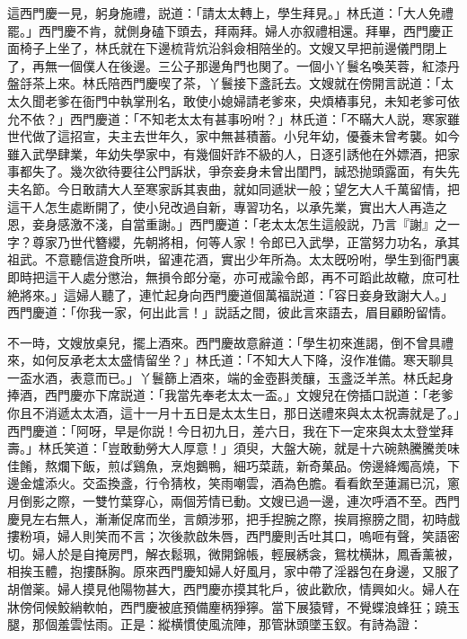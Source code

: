 這西門慶一見，躬身施禮，説道：「請太太轉上，學生拜見。」林氏道：「大人免禮罷。」西門慶不肯，就側身磕下頭去，拜兩拜。婦人亦叙禮相還。拜畢，西門慶正面椅子上坐了，林氏就在下邊梳背炕沿斜僉相陪坐的。文嫂又早把前邊儀門閉上了，再無一個僕人在後邊。三公子那邊角門也関了。一個小丫鬟名喚芙蓉，紅漆丹盤㧱茶上來。林氏陪西門慶喫了茶，丫鬟接下盞託去。文嫂就在傍開言説道：「太太久聞老爹在衙門中執掌刑名，敢使小媳婦請老爹來，央煩樁事兒，未知老爹可依允不依？」西門慶道：「不知老太太有甚事吩咐？」林氏道：「不瞞大人説，寒家雖世代做了這招宣，夫主去世年久，家中無甚積蓄。小兒年幼，優養未曾考襲。如今雖入武學肆業，年幼失學家中，有幾個奸詐不級的人，日逐引誘他在外嫖酒，把家事都失了。幾次欲待要往公門訴狀，爭奈妾身未曾出閨門，誠恐抛頭露面，有失先夫名節。今日敢請大人至寒家訴其衷曲，就如同遞狀一般；望乞大人千萬留情，把這干人怎生處断開了，使小兒改過自新，專習功名，以承先業，實出大人再造之恩，妾身感激不淺，自當重謝。」西門慶道：「老太太怎生這般説，乃言『謝』之一字？尊家乃世代簪纓，先朝將相，何等人家！令郎已入武學，正當努力功名，承其祖武。不意聽信遊食所哄，留連花酒，實出少年所為。太太旣吩咐，學生到衙門裏即時把這干人處分懲治，無損令郎分毫，亦可戒諭令郎，再不可蹈此故轍，庶可杜絶將來。」這婦人聽了，連忙起身向西門慶道個萬福説道：「容日妾身致謝大人。」西門慶道：「你我一家，何出此言！」説話之間，彼此言來語去，眉目顧盼留情。

不一時，文嫂放桌兒，擺上酒來。西門慶故意辭道：「學生初來進謁，倒不曾具禮來，如何反承老太太盛情留坐？」林氏道：「不知大人下降，沒作准備。寒天聊具一盃水酒，表意而已。」丫鬟篩上酒來，端的金壺斟羙釀，玉盞泛羊羔。林氏起身捧酒，西門慶亦下席説道：「我當先奉老太太一盃。」文嫂兒在傍插口説道：「老爹你且不消遞太太酒，這十一月十五日是太太生日，那日送禮來與太太祝壽就是了。」西門慶道：「阿呀，早是你説！今日初九日，差六日，我在下一定來與太太登堂拜壽。」林氏笑道：「豈敢動勞大人厚意！」須臾，大盤大碗，就是十六碗熱騰騰羙味佳餚，熬爛下飯，煎ぱ鷄魚，烹炮鵝鴨，細巧菜蔬，新奇菓品。傍邊絳燭高燒，下邊金爐添火。交盃換盞，行令猜枚，笑雨嘲雲，酒為色膽。看看飲至蓮漏已沉，窻月倒影之際，一雙竹葉穿心，兩個芳情已動。文嫂已過一邊，連次呼酒不至。西門慶見左右無人，漸漸促席而坐，言頗涉邪，把手揑腕之際，挨肩擦膀之間，初時戲摟粉項，婦人則笑而不言；次後款啟朱唇，西門慶則舌吐其口，嗚咂有聲，笑語密切。婦人於是自掩房門，解衣鬆珮，微開錦帳，輕展綉衾，鴛枕横牀，鳳香薰被，相挨玉體，抱摟酥胸。原來西門慶知婦人好風月，家中帶了淫器包在身邊，又服了胡僧薬。婦人摸見他陽物甚大，西門慶亦摸其牝戶，彼此歡欣，情興如火。婦人在牀傍伺候鮫綃軟帕，西門慶被底預備麈柄猙獰。當下展猿臂，不覺蝶浪蜂狂；蹺玉腿，那個羞雲怯雨。正是：縱横慣使風流陣，那管牀頭墜玉釵。有詩為證：

